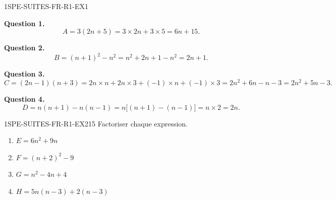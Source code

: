 \begin{corrige}{1SPE-SUITES-FR-R1-EX1}


\textbf{Question 1.}
\[
A = 3(2n + 5) = 3 \times 2n + 3 \times 5 = 6n + 15.
\]


\textbf{Question 2.}
\[
B = (n+1)^2 - n^2 = n^2 + 2n + 1 - n^2 = 2n + 1.
\]


\textbf{Question 3.}
\[
C = (2n-1)(n+3) = 2n \times n + 2n \times 3 + (-1) \times n + (-1) \times 3
    = 2n^2 + 6n - n - 3 = 2n^2 + 5n - 3.
\]


\textbf{Question 4.}
\[
D = n(n+1) - n(n-1) = n\bigl[(n+1)-(n-1)\bigr] = n \times 2 = 2n.
\]

\end{corrige}


\begin{exercice}{1SPE-SUITES-FR-R1-EX2}{1}{5}
Factoriser chaque expression.
\begin{enumerate}
  \item $E = 6n^2 + 9n$
  \item $F = (n+2)^2 - 9$
  \item $G = n^2 - 4n + 4$
  \item $H = 5n(n-3) + 2(n-3)$
\end{enumerate}
\end{exercice}


